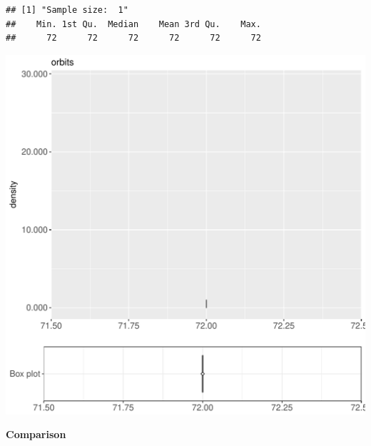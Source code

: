\documentclass{article}\usepackage[]{graphicx}\usepackage[]{color}
\makeatletter
\def\maxwidth{ %
  \ifdim\Gin@nat@width>\linewidth
    \linewidth
  \else
    \Gin@nat@width
  \fi
}
\newenvironment{kframe}{%
 \def\at@end@of@kframe{}%
 \ifinner\ifhmode%
  \def\at@end@of@kframe{\end{minipage}}%
  \begin{minipage}{\columnwidth}%
 \fi\fi%
 \def\FrameCommand##1{\hskip\@totalleftmargin \hskip-\fboxsep
 \colorbox{shadecolor}{##1}\hskip-\fboxsep
     \hskip-\linewidth \hskip-\@totalleftmargin \hskip\columnwidth}%
 \MakeFramed {\advance\hsize-\width
   \@totalleftmargin\z@ \linewidth\hsize
   \@setminipage}}%
 {\par\unskip\endMakeFramed%
 \at@end@of@kframe}
\newenvironment{knitrout}{}{} %
\makeatother
\begin{document}
\begin{knitrout}
\color{fgcolor}\begin{kframe}
\begin{verbatim}
## [1] "Sample size:  1"
##    Min. 1st Qu.  Median    Mean 3rd Qu.    Max. 
##      72      72      72      72      72      72
\end{verbatim}


{\ttfamily\noindent\bfseries{}}\end{kframe}
\includegraphics[width=\maxwidth]{figure/RH5_cashewExceptOrder_big-1} 

\end{knitrout}
  
 \textbf{Comparison}
  
\end{document}
